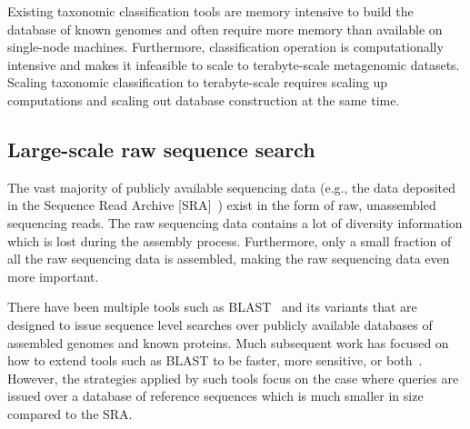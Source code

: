 \begin{rproblem}
Existing taxonomic classification tools are memory intensive to build the database of known genomes and often require more memory than available on single-node machines. Furthermore, classification operation is computationally intensive and makes it infeasible to scale to terabyte-scale metagenomic datasets. 
 Scaling taxonomic classification to terabyte-scale requires scaling up computations and scaling out database construction at the same time.
\label{rprob:peppermint}
\end{rproblem}



\subsection{Large-scale raw sequence search}

The vast majority of publicly available sequencing data (e.g., the data deposited in the Sequence Read Archive [SRA]~\cite{kodama2012sequence}) exist in the form of raw, unassembled sequencing reads. The raw sequencing data contains a lot of diversity information   which is lost during the assembly process. Furthermore, only a small fraction of all the raw sequencing data is assembled, making the raw sequencing data even more important. 

There have been multiple tools such as BLAST~\cite{altschul1990basic} and its variants that are designed to issue  sequence level searches over publicly available databases of assembled genomes and known proteins. Much subsequent work has focused on how to extend tools such as BLAST to be faster, more sensitive, or both~\cite{XXX}.   However, the strategies applied by such tools focus on the case where queries are issued over a database of reference sequences which is much smaller in size compared to the SRA. 

